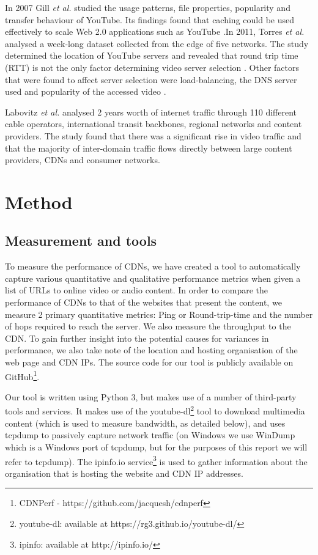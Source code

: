 \documentclass{sig-alternate-05-2015}
\begin{document}
In 2007 Gill \textit{et al.} \cite{Gill:2007:YTC:1298306.1298310} studied the usage patterns, file properties, popularity and transfer behaviour of YouTube. Its findings found that caching could be used effectively to scale Web 2.0 applications such as YouTube \cite{Gill:2007:YTC:1298306.1298310}.In 2011, Torres \textit{et al.} \cite{5961681} analysed a week-long dataset collected from the edge of five networks. The study determined the location of YouTube servers and revealed that round trip time (RTT) is not the only factor determining video server selection \cite{5961681}. Other factors that were found to affect server selection were load-balancing, the DNS server used and popularity of the accessed video \cite{5961681}.

Labovitz \textit{et al.} \cite{Labovitz:2010:IIT:2043164.1851194} analysed 2 years worth of internet traffic through 110 different cable operators, international transit backbones, regional networks and content providers. The study found that there was a significant rise in video traffic and that the majority of inter-domain traffic flows directly between large content providers, CDNs and consumer networks.

\section{Method}\label{sec:method}
\subsection{Measurement and tools}
%

To measure the performance of CDNs, we have created a tool to automatically capture various quantitative and qualitative performance metrics when given a list of URLs to online video or audio content. In order to compare the performance of CDNs to that of the websites that present the content, we measure 2 primary quantitative metrics: Ping or Round-trip-time and the number of hops required to reach the server. We also measure the throughput to the CDN. To gain further insight into the potential causes for variances in performance, we also take note of the location and hosting organisation of the web page and CDN IPs. The source code for our tool is publicly available on GitHub\footnote{CDNPerf -  https://github.com/jacquesh/cdnperf}.

Our tool is written using Python 3, but makes use of a number of third-party tools and services. It makes use of the youtube-dl\footnote{youtube-dl: available at https://rg3.github.io/youtube-dl/} tool to download multimedia content (which is used to measure bandwidth, as detailed below), and uses tcpdump to passively capture network traffic (on Windows we use WinDump which is a Windows port of tcpdump, but for the purposes of this report we will refer to tcpdump). The ipinfo.io service\footnote{ipinfo: available at http://ipinfo.io/} is used to gather information about the organisation that is hosting the website and CDN IP addresses.
\end{document}
